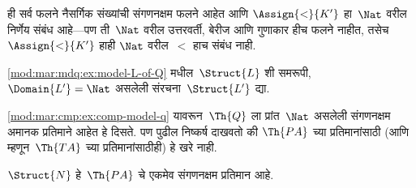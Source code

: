 \begin{ex}
ही सर्व फलने नैसर्गिक संख्यांची संगणनक्षम फलने आहेत आणि
$\Assign{<}{K'}$ हा~$\Nat$ वरील निर्णेय संबंध आहे---पण ती~$\Nat$ वरील
उत्तरवर्ती, बेरीज आणि गुणाकार हीच फलने नाहीत, तसेच $\Assign{<}{K'}$ हाही
$\Nat$ वरील~$<$ हाच संबंध नाही.
\end{ex}

\begin{prob}
\ref{mod:mar:mdq:ex:model-L-of-Q} मधील~$\Struct{L}$ शी समरूपी,
$\Domain{L'} = \Nat$ असलेली संरचना~$\Struct{L'}$ द्या.
\end{prob}

\begin{explain}
\ref{mod:mar:cmp:ex:comp-model-q} यावरून~$\Th{Q}$ ला प्रांत~$\Nat$ असलेली
संगणनक्षम अमानक प्रतिमाने आहेत हे दिसते. पण पुढील निष्कर्ष दाखवतो की
$\Th{PA}$ च्या प्रतिमानांसाठी (आणि म्हणून~$\Th{TA}$ च्या प्रतिमानांसाठीही)
हे खरे नाही.
\end{explain}

\begin{thm}[टेनेनबाउमचे प्रमेय]
$\Struct{N}$ हे~$\Th{PA}$ चे एकमेव संगणनक्षम प्रतिमान आहे.
\end{thm}



